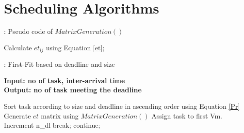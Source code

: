 \documentclass[conference]{IEEEtran}
\begin{document}
\section{Scheduling Algorithms}\vspace{30pt}

\begin{algorithm}[h]
\caption{: Pseudo code of $MatrixGeneration()$}
\label{alg1}
\begin{algorithmic}[1]
      \State  Calculate $et_{ij}$ using Equation \ref{et};
     \EndFor
     \EndFor
\end{algorithmic}
\end{algorithm}

\vspace{30pt}

\begin{algorithm}[]
\caption{: First-Fit based on deadline and size}
\label{euclid}
\hspace*{\algorithmicindent} \textbf{Input: no of task, inter-arrival time} \\
 \hspace*{\algorithmicindent} \textbf{Output: no of task meeting the deadline} 
\begin{algorithmic}[1]
  
   \State Sort task according to size and deadline in ascending order using Equation \ref{Pr}
   \State Generate $et$ matrix using $MatrixGeneration()$
          \State Assign task to first Vm.
                  \State Increment n\_dl
                  \State break;
                  \Else
                  \State continue;
               \EndIf
       \EndFor
      \EndIf 
    \EndFor  
\EndFor
\end{algorithmic}
\end{algorithm}

\vspace{30pt}
\end{document}
